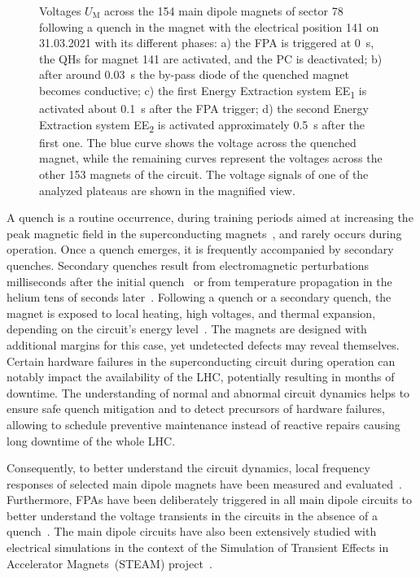 \documentclass[lettersize,journal]{IEEEtran}
\begin{document}
\begin{figure}
    \centering
    
    \caption{Voltages $U_\text{M}$ across the 154 main dipole magnets of sector 78 following a quench in the magnet with the electrical position 141 on 31.03.2021 with its different phases: a) the FPA is triggered at 0~s, the QHs for magnet 141 are activated, and the PC is deactivated; b) after around 0.03~s the by-pass diode of the quenched magnet becomes conductive; c) the first Energy Extraction system EE\textsubscript{1} is activated about 0.1~s after the FPA trigger; d) the second Energy Extraction system EE\textsubscript{2} is activated approximately 0.5~s after the first one. 
    The blue curve shows the voltage across the quenched magnet, while the remaining curves represent the voltages across the other 153 magnets of the circuit. 
    The voltage signals of one of the analyzed plateaus are shown in the magnified view. }
    \label{timeseries}
\end{figure}

A quench is a routine occurrence, during training periods aimed at increasing the peak magnetic field in the superconducting magnets~\cite{verweij2008}, and rarely occurs during operation.
Once a quench emerges, it is frequently accompanied by secondary quenches. 
Secondary quenches result from electromagnetic perturbations milliseconds after the initial quench~\cite{ravaioli2012} or from temperature propagation in the helium tens of seconds later~\cite{Coull1996}.
Following a quench or a secondary quench, the magnet is exposed to local heating, high voltages, and thermal expansion, depending  on the circuit's energy level~\cite{siemko_magnet_2023}.
The magnets are designed with additional margins for this case, yet undetected defects may reveal themselves.
Certain hardware failures in the superconducting circuit during operation can notably impact the availability of the LHC, potentially resulting in months of downtime. 
The understanding of normal and abnormal circuit dynamics helps to ensure safe quench mitigation and to detect precursors of hardware failures, allowing to schedule preventive maintenance instead of reactive repairs causing long downtime of the whole LHC.

Consequently, to better understand the circuit dynamics, local frequency responses of selected main dipole magnets have been measured and evaluated~\cite{Saederup2021,Ravaioli2013}. 
Furthermore, FPAs have been deliberately triggered in all main dipole circuits to better understand the voltage transients in the circuits in the absence of a quench~\cite{ravaioli2011}.
The main dipole circuits have also been extensively studied with electrical simulations in the context of the Simulation of Transient Effects in Accelerator Magnets~(STEAM) project~\cite{STEAMWebsite, janitschke2021framework}.
\end{document}
